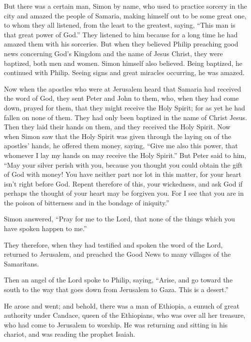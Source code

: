  But there was a certain man, Simon by name, who used to
practice sorcery in the city and amazed the people of Samaria, making
himself out to be some great one,  to whom they all
listened, from the least to the greatest, saying, ``This man is that
great power of God.''  They listened to him because for a
long time he had amazed them with his sorceries.  But
when they believed Philip preaching good news concerning God's Kingdom
and the name of Jesus Christ, they were baptized, both men and women.
 Simon himself also believed. Being baptized, he
continued with Philip. Seeing signs and great miracles occurring, he was
amazed.

 Now when the apostles who were at Jerusalem heard that
Samaria had received the word of God, they sent Peter and John to them,
 who, when they had come down, prayed for them, that they
might receive the Holy Spirit;  for as yet he had fallen
on none of them. They had only been baptized in the name of Christ
Jesus.  Then they laid their hands on them, and they
received the Holy Spirit.  Now when Simon saw that the
Holy Spirit was given through the laying on of the apostles' hands, he
offered them money,  saying, ``Give me also this power,
that whomever I lay my hands on may receive the Holy Spirit.''
 But Peter said to him, ``May your silver perish with
you, because you thought you could obtain the gift of God with money!
 You have neither part nor lot in this matter, for your
heart isn't right before God.  Repent therefore of this,
your wickedness, and ask God if perhaps the thought of your heart may be
forgiven you.  For I see that you are in the poison of
bitterness and in the bondage of iniquity.''

 Simon answered, ``Pray for me to the Lord, that none of
the things which you have spoken happen to me.''

 They therefore, when they had testified and spoken the
word of the Lord, returned to Jerusalem, and preached the Good News to
many villages of the Samaritans.

 Then an angel of the Lord spoke to Philip, saying,
``Arise, and go toward the south to the way that goes down from
Jerusalem to Gaza. This is a desert.''

 He arose and went; and behold, there was a man of
Ethiopia, a eunuch of great authority under Candace, queen of the
Ethiopians, who was over all her treasure, who had come to Jerusalem to
worship.  He was returning and sitting in his chariot,
and was reading the prophet Isaiah.

